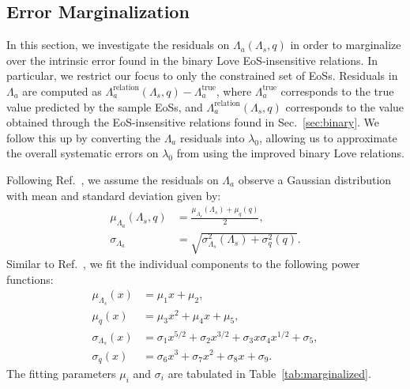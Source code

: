 \documentclass[prd,twocolumn,nofootinbib,superscriptaddress,amsmath,amssymb]{revtex4-1}
\begin{document}
\subsection{Error Marginalization}\label{sec:marginalization}

In this section, we investigate the residuals on $\Lambda_a(\Lambda_s,q)$ in order to marginalize over the intrinsic error found in the binary Love EoS-insensitive relations.
In particular, we restrict our focus to only the constrained set of EoSs.
Residuals in $\Lambda_a$ are computed as $\Lambda_a^{\text{relation}}(\Lambda_s,q)-\Lambda_a^{\text{true}}$, where $\Lambda_a^{\text{true}}$ corresponds to the true value predicted by the sample EoSs, and $\Lambda_a^{\text{relation}}(\Lambda_s,q)$ corresponds to the value obtained through the EoS-insensitive relations found in Sec.~\ref{sec:binary}.
We follow this up by converting the $\Lambda_a$ residuals into $\lambda_0$, allowing us to approximate the overall systematic errors on $\lambda_0$ from using the improved binary Love relations.

Following Ref.~\cite{Katerina:residuals}, we assume the residuals on $\Lambda_a$ observe a Gaussian distribution with mean and standard deviation given by:
\begin{align}
\mu_{\Lambda_a}(\Lambda_s,q) &=\frac{\mu_{\Lambda_s}(\Lambda_s)+\mu_{q}(q)}{2},\\ 
\sigma_{\Lambda_a} &=\sqrt{\sigma_{\Lambda_s}^2(\Lambda_s) + \sigma_{q}^2(q)}. 
\end{align}
Similar to Ref.~\cite{Katerina:residuals}, we fit the individual components to the following power functions:
\begin{align}
\mu_{\Lambda_s}(x) &= \mu_1 x + \mu_2, \label{eq:margFit1}\\ 
\mu_{q}(x) &= \mu_3 x^2 + \mu_4 x + \mu_5, \label{eq:margFit2}\\ 
\sigma_{\Lambda_s}(x) &= \sigma_1 x^{5/2} + \sigma_2 x^{3/2} + \sigma_3 x \sigma_4 x^{1/2} + \sigma_5, \label{eq:margFit3}\\ 
\sigma_{q}(x) &= \sigma_6 x^3 + \sigma_7 x^2 + \sigma_8 x + \sigma_9. \label{eq:margFit4}
\end{align}
The fitting parameters $\mu_i$ and $\sigma_i$ are tabulated in Table~\ref{tab:marginalized}.
\end{document}
